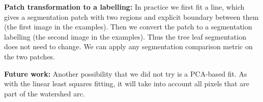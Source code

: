 \textbf{Patch transformation to a labelling:} In practice we first fit a line, which gives a segmentation patch with two regions and explicit boundary between them (the first image in the examples). Then we convert the patch to a segmentation labelling (the second image in the examples). Thus the tree leaf segmentation does not need to change. We can apply any segmentation comparison metric on the two patches.

\textbf{Future work:} Another possibility that we did not try is a PCA-based fit. As with the linear least squares fitting, it will take into account all pixels that are part of the watershed arc.

\begin{figure}[ht!]
\begin{center}


\end{center}
\end{figure}

